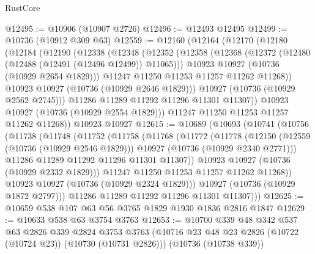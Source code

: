 \begin{lexlean}{RustCore}
\begin{coremodule}
@12495 := @10906 (@10907 @2726)
@12496 := @12493 @12495
@12499 := @10736 (@10912 @309 @63)
@12559 := @12160
    (@12164
      (@12170
        (@12180
          (@12184
            (@12190
              (@12338
                (@12348
                  (@12352
                    (@12358
                      (@12368
                        (@12372 (@12480 (@12488 (@12491 (@12496 @12499)) @11065)))
                        @10923
                        @10927
                        (@10736 (@10929 @2654 @1829)))
                      @11247
                      @11250
                      @11253
                      @11257
                      @11262
                      @11268))
                  @10923
                  @10927
                  (@10736 (@10929 @2646 @1829)))
                @10927
                (@10736 (@10929 @2562 @2745)))
              @11286
              @11289
              @11292
              @11296
              @11301
              @11307))
          @10923
          @10927
          (@10736 (@10929 @2554 @1829)))
        @11247
        @11250
        @11253
        @11257
        @11262
        @11268))
    @10923
    @10927
@12615 := @10689
    (@10693
      (@10741
        (@10756
          (@11738
            (@11748
              (@11752
                (@11758
                  (@11768
                    (@11772
                      (@11778
                        (@12150
                          (@12559 (@10736 (@10929 @2546 @1829)))
                          @10927
                          (@10736 (@10929 @2340 @2771)))
                        @11286
                        @11289
                        @11292
                        @11296
                        @11301
                        @11307))
                    @10923
                    @10927
                    (@10736 (@10929 @2332 @1829)))
                  @11247
                  @11250
                  @11253
                  @11257
                  @11262
                  @11268))
              @10923
              @10927
              (@10736 (@10929 @2324 @1829)))
            @10927
            (@10736 (@10929 @1872 @2797)))
          @11286
          @11289
          @11292
          @11296
          @11301
          @11307)))
@12625 := @10659 @538 @107 @63 @56 @3765 @1829 @1930 @1836 @2816 @1847
@12629 := @10633 @538 @63 @3754 @3763
@12653 := @10700
    @339
    @48
    @342
    @537
    @63
    @2826
    @339
    @2824
    @3753
    @3763
    (@10716 @23 @48 @23 @2826 (@10722 (@10724 @23)) (@10730 (@10731 @2826)))
    (@10736 (@10738 @339))

\end{coremodule}
\end{lexlean}
